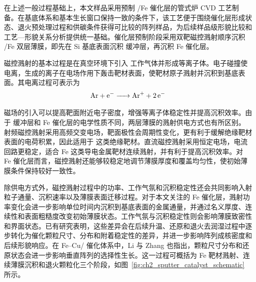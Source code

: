 在上述一般过程基础上，本文样品采用预制 /Fe 催化层的管式炉 CVD 工艺制备。在基底体系和基本生长窗口保持一致的条件下，该工艺便于围绕催化层形成状态、退火预处理过程和供碳条件获得可比较的阵列样品，为后续样品级形貌比较和工艺—形貌关系分析提供统一基础。催化层预制阶段采用双靶磁控溅射顺序沉积 /Fe 双层薄膜，即先在 Si 基底表面沉积  缓冲层，再沉积 Fe 催化层。

磁控溅射的基本过程是在真空环境下引入  工作气体并形成等离子体。电子碰撞使  电离，生成的离子在电场作用下轰击靶材表面，使靶材原子溅射并沉积到基底表面。其电离过程可表示为
\begin{equation}
\ce{Ar + e^- -> Ar+ + 2e^-}
\end{equation}

磁场的引入可以提高靶面附近电子密度，增强等离子体稳定性并提高沉积效率。由于  缓冲层和 Fe 催化层的电学性质不同，两层薄膜的溅射供电方式也有所区别。射频磁控溅射采用高频交变电场，靶面极性会周期性变化，更有利于缓解绝缘靶材表面的电荷积累，因此适用于  这类绝缘靶材。直流磁控溅射采用恒定电场，电流回路更稳定，适合 Fe 这类导电金属靶材连续溅射，并有利于提高沉积效率。对 Fe 催化层而言，磁控溅射还能够较稳定地调节薄膜厚度和覆盖均匀性，使初始薄膜条件保持较好一致性\cite{Aleksanyan2023RFMagnetron}。

除供电方式外，磁控溅射过程中的功率、工作气氛和沉积稳定性还会共同影响入射粒子通量、沉积速率以及薄膜表面迁移过程。对于本文关注的 Fe 催化层，溅射功率变化会进一步影响单位时间内沉积到基底表面的金属通量，并通过名义厚度、连续性和表面粗糙度改变初始薄膜状态。工作气氛与沉积稳定性则会影响薄膜致密性和界面状态。已有研究表明，这些差异会在后续升温、还原和退火去润湿过程中逐步转化为催化颗粒尺寸、分布和附着稳定性的差异，并进一步影响阵列成核密度和后续形貌响应\cite{Aleksanyan2023RFMagnetron,Yang2016ALDThicknessCN}。在 Fe--Cu/ 催化体系中，Li 与 Zhang 也指出，颗粒尺寸分布和还原状态会进一步影响垂直阵列的选择性生长\cite{Li2016FeCuCNTForest}。这一过程可概括为 Fe 靶材溅射、连续薄膜沉积和退火颗粒化三个阶段，如图~\ref{fig:ch2_sputter_catalyst_schematic} 所示。

